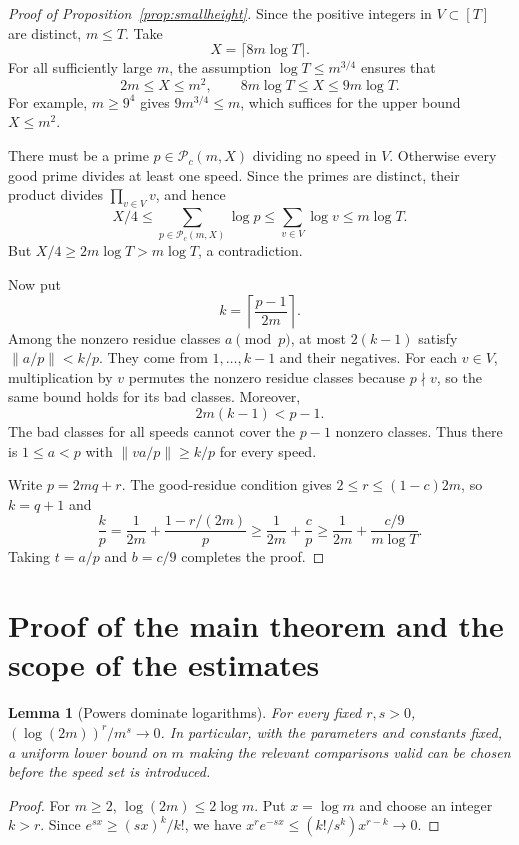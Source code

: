\documentclass[12pt,leqno]{article}
\numberwithin{equation}{section}
\newtheorem{lemma}[theorem]{Lemma}
\theoremstyle{remark}
\begin{document}
\begin{proof}[Proof of Proposition~\ref{prop:smallheight}]
Since the positive integers in $V\subset[T]$ are distinct, $m\le T$. Take
\[
X=\lceil8m\log T\rceil.
\]
For all sufficiently large $m$, the assumption $\log T\le m^{3/4}$ ensures that
\[
2m\le X\le m^2,\qquad 8m\log T\le X\le9m\log T.
\]
For example, $m\ge9^4$ gives $9m^{3/4}\le m$, which suffices for the upper bound $X\le m^2$.

There must be a prime $p\in\mathcal P_c(m,X)$ dividing no speed in $V$. Otherwise every good prime divides at least one speed. Since the primes are distinct, their product divides $\prod_{v\in V}v$, and hence
\[
X/4\le\sum_{p\in\mathcal P_c(m,X)}\log p
\le\sum_{v\in V}\log v\le m\log T.
\]
But $X/4\ge2m\log T>m\log T$, a contradiction.

Now put
\[
k=\left\lceil\frac{p-1}{2m}\right\rceil.
\]
Among the nonzero residue classes $a\pmod p$, at most $2(k-1)$ satisfy $\|a/p\|<k/p$. They come from $1,\ldots,k-1$ and their negatives. For each $v\in V$, multiplication by $v$ permutes the nonzero residue classes because $p\nmid v$, so the same bound holds for its bad classes. Moreover,
\[
2m(k-1)<p-1.
\]
The bad classes for all speeds cannot cover the $p-1$ nonzero classes. Thus there is $1\le a<p$ with $\|va/p\|\ge k/p$ for every speed.

Write $p=2mq+r$. The good-residue condition gives $2\le r\le(1-c)2m$, so $k=q+1$ and
\[
\frac kp=\frac1{2m}+\frac{1-r/(2m)}p
\ge\frac1{2m}+\frac cp
\ge\frac1{2m}+\frac{c/9}{m\log T}.
\]
Taking $t=a/p$ and $b=c/9$ completes the proof.
\end{proof}

\section{Proof of the main theorem and the scope of the estimates}
\begin{lemma}[Powers dominate logarithms]\label{lem:asymptotic}
For every fixed $r,s>0$, $(\log(2m))^r/m^s\to0$. In particular, with the parameters and constants fixed, a uniform lower bound on $m$ making the relevant comparisons valid can be chosen before the speed set is introduced.
\end{lemma}
\begin{proof}
For $m\ge2$, $\log(2m)\le2\log m$. Put $x=\log m$ and choose an integer $k>r$. Since $e^{sx}\ge(sx)^k/k!$, we have $x^re^{-sx}\le(k!/s^k)x^{r-k}\to0$.
\end{proof}
\end{document}
